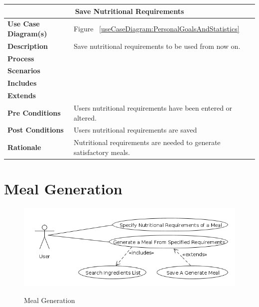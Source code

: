 \documentclass[12pt]{article}
\begin{document}
\begin{center}
\begin{tabularx}{\textwidth}{ |X|X|}
\hline
\multicolumn{2}{|c|}{\textbf{Save Nutritional Requirements}}\\
\hline
\hline
\textbf{Use Case Diagram(s)} & Figure ~\ref{useCaseDiagram:PersonalGoalsAndStatistics}\\ \hline
\textbf{Description} & Save nutritional requirements to be used from now on.\\ \hline
\textbf{Process} & \\ \hline
\textbf{Scenarios} & \\ \hline
\textbf{Includes} & \\ \hline
\textbf{Extends} &  \\ \hline
\textbf{Pre Conditions} & Users  nutritional requirements have been entered or altered.\\ \hline
\textbf{Post Conditions} & Users nutritional requirements are saved\\ \hline
\textbf{Rationale} & Nutritional requirements are needed to generate satisfactory meals.\\ \hline
\end{tabularx}
\end{center}


\newpage
\section{Meal Generation} %

\begin{figure}[h]
\caption{Meal Generation}
\centering
\includegraphics[width = 1\textwidth]{MealGeneration.png}
\label{useCaseDiagram:MealGeneration}
\end{figure}
\end{document}
